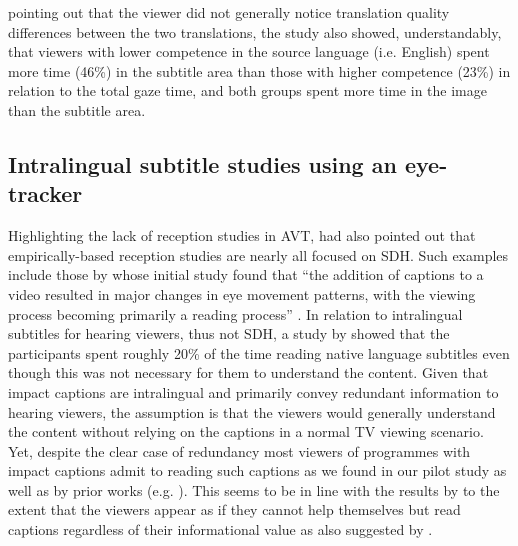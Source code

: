 \documentclass[output=paper]{langsci/langscibook}
\begin{document}
pointing out that the viewer did not generally notice translation quality differences between the two translations, the study also showed, understandably, that viewers with lower competence in the source language (i.e. English) spent more time (46\%) in the subtitle area than those with higher competence (23\%) in relation to the total gaze time, and both groups spent more time in the image than the subtitle area.


\subsection{Intralingual subtitle studies using an eye-tracker}

Highlighting the lack of reception studies in AVT, \citet[30]{gambier2008} had also pointed out that empirically-based reception studies are nearly all focused on SDH.  Such examples include those by \citep{jensema2000a, jensema2000b} whose initial study found that ``the addition of captions to a video resulted in major changes in eye movement patterns, with the viewing process becoming primarily a reading process'' \citep[275]{jensema2000a}. In relation to intralingual subtitles for hearing viewers, thus not SDH, a study by \citet{dydewalle1991} showed that the participants spent roughly 20\% of the time reading native language subtitles even though this was not necessary for them to understand the content. Given that impact captions are intralingual and primarily convey redundant information to hearing viewers, the assumption is that the viewers would generally understand the content without relying on the captions in a normal TV viewing scenario. Yet, despite the clear case of redundancy most viewers of programmes with impact captions admit to reading such captions as we found in our pilot study as well as by prior works (e.g. \citealt{Kimura2000}). This seems to be in line with the results by \citet{dydewalle1991} to the extent that the viewers appear as if they cannot help themselves but read captions regardless of their informational value as also suggested by \citet{bisson2014}. 
\end{document}
